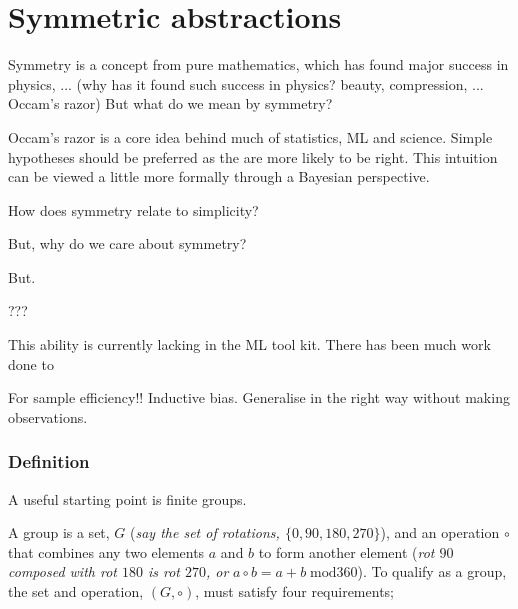 \newpage
\section{Symmetric abstractions}\label{symmetric-abstractions}



Symmetry is a concept from pure mathematics, which has found major success in physics, ...
(why has it found such success in physics? beauty, compression, ... Occam's razor)
But what do we mean by symmetry?



Occam's razor is a core idea behind much of statistics, ML and science. Simple
hypotheses should be preferred as the are more likely to be right. This intuition
can be viewed a little more formally through a Bayesian perspective.

How does symmetry relate to simplicity?

But, why do we care about symmetry?

But.

???

This ability is currently lacking in the ML tool kit. There has been much work done to

For sample efficiency!! Inductive bias. Generalise in the right way without making observations.

\subsubsection{Definition}

A useful starting point is finite groups.

A group is a set, $G$ (\textit{say the set of rotations, $\{0, 90, 180, 270\}$}),
and an operation $\circ$ that combines any two elements $a$ and $b$ to form
another element (\textit{rot $90$ composed with rot $180$ is rot $270$, or} $a \circ b = a + b \;\text{mod} 360$).
To qualify as a group, the set and operation, $(G, \circ)$, must satisfy four requirements;

